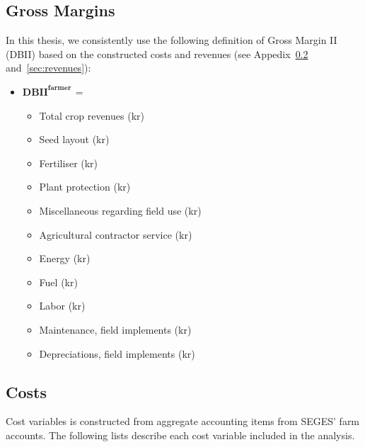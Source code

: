 \documentclass[12pt]{article}
\begin{document}
\subsection{Gross Margins}
\label{sec:gross-margin-ii}
In this thesis, we consistently use the following definition of Gross Margin II (DBII) based on the constructed costs and revenues (see Appedix~\ref{sec:cost-variables} and~\ref{sec:revenues}):
\begin{itemize}
    \item[] \textbf{$\mathrm{\textbf{DBII}^{\textbf{farmer}}}$ $\textbf{=}$}
    \begin{itemize}
        \item[$+$] Total crop revenues (kr)
        \item[$-$] Seed layout (kr)
        \item[$-$] Fertiliser (kr)
        \item[$-$] Plant protection (kr)
        \item[$-$] Miscellaneous regarding field use (kr)
        \item[$-$] Agricultural contractor service (kr)
        \item[$-$] Energy (kr)
        \item[$-$] Fuel (kr)
        \item[$-$] Labor (kr)
        \item[$-$] Maintenance, field implements (kr)
        \item[$-$] Depreciations, field implements (kr)
    \end{itemize}
\end{itemize}

\subsection{Costs}
\label{sec:cost-variables}
Cost variables is constructed from aggregate accounting items from SEGES' farm accounts.
The following lists describe each cost variable included in the analysis.
\end{document}
